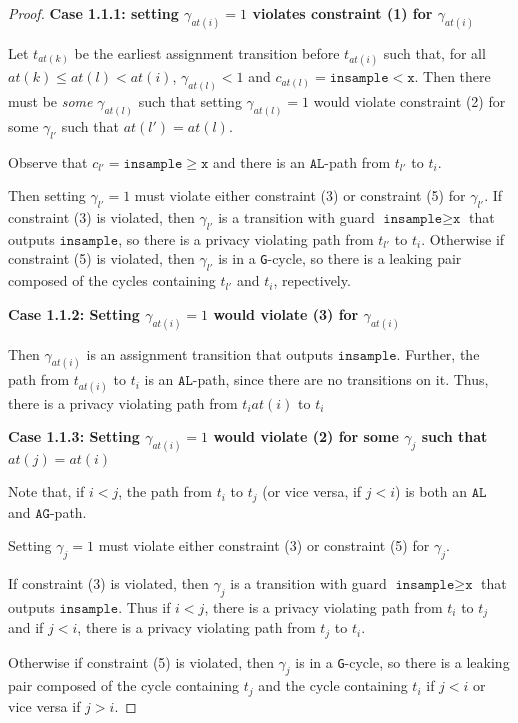 \documentclass[12pt]{article}
\newcommand{\gguard}[1][x]{\texttt{insample}\geq #1}
\newcommand{\lguard}[1][x]{\texttt{insample} < #1}
\newcommand{\gcycle}{\texttt{G}-cycle}
\theoremstyle{definition}
\begin{document}
\begin{proof}
    \textbf{Case 1.1.1: setting $\gamma_{at(i)} = 1$ violates constraint (1) for $\gamma_{at(i)}$}

    Let $t_{at(k)}$ be the earliest assignment transition before $t_{at(i)}$ such that, for all $at(k)\leq at(l)< at(i)$, $\gamma_{at(l)} <1$ and $c_{at(l)} = \lguard[\texttt{x}]$. Then there must be \textit{some} $\gamma_{at(l)}$ such that setting $\gamma_{at(l)} = 1$ would violate constraint (2) for some $\gamma_{l'}$ such that $at(l') = at(l)$. 

    Observe that $c_{l'} = \gguard[\texttt{x}]$ and there is an $\texttt{AL}$-path from $t_{l'}$ to $t_i$. 

    Then setting $\gamma_{l'}= 1$ must violate either constraint (3) or constraint (5) for $\gamma_{l'}$. If constraint (3) is violated, then $\gamma_{l'}$ is a transition with guard $\gguard[\texttt{x}]$ that outputs $\texttt{insample}$, so there is a privacy violating path from $t_{l'}$ to $t_i$. Otherwise if constraint (5) is violated, then $\gamma_{l'}$ is in a \gcycle, so there is a leaking pair composed of the cycles containing $t_{l'}$ and $t_i$, repectively. 

    \textbf{Case 1.1.2: Setting $\gamma_{at(i)}=1$ would violate (3) for $\gamma_{at(i)}$}

    Then $\gamma_{at(i)}$ is an assignment transition that outputs $\texttt{insample}$. Further, the path from $t_{at(i)}$ to $t_i$ is an $\texttt{AL}$-path, since there are no transitions on it. Thus, there is a privacy violating path from $t_i{at(i)}$ to $t_i$

    \textbf{Case 1.1.3: Setting $\gamma_{at(i)}=1$ would violate (2) for some $\gamma_j$ such that $at(j)= at(i)$}

    Note that, if $i<j$, the path from $t_i$ to $t_j$ (or vice versa, if $j<i$) is both an $\texttt{AL}$ and $\texttt{AG}$-path.

    Setting $\gamma_{j}= 1$ must violate either constraint (3) or constraint (5) for $\gamma_{j}$. 
    
    If constraint (3) is violated, then $\gamma_{j}$ is a transition with guard $\gguard[\texttt{x}]$ that outputs $\texttt{insample}$. Thus if $i<j$, there is a privacy violating path from $t_i$ to $t_j$ and if $j<i$, there is a privacy violating path from $t_j$ to $t_i$. 
    
    Otherwise if constraint (5) is violated, then $\gamma_{j}$ is in a \gcycle, so there is a leaking pair composed of the cycle containing $t_j$ and the cycle containing $t_i$ if $j<i$ or vice versa if $j>i$. 


\end{proof}
\end{document}
